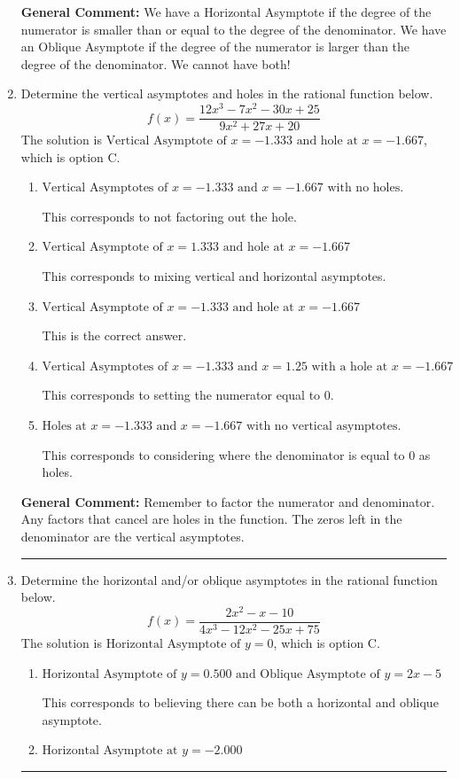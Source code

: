 \documentclass{extbook}[14pt]
\newcommand{\litem}[1]{\item #1

\rule{\textwidth}{0.4pt}}
\begin{document}
\begin{enumerate}
{\textbf{General Comment:} We have a Horizontal Asymptote if the degree of the numerator is smaller than or equal to the degree of the denominator. We have an Oblique Asymptote if the degree of the numerator is larger than the degree of the denominator. We cannot have both!
}
\litem{
Determine the vertical asymptotes and holes in the rational function below.
\[ f(x) = \frac{12x^{3} -7 x^{2} -30 x + 25}{9x^{2} +27 x + 20} \]The solution is \( \text{Vertical Asymptote of } x = -1.333 \text{ and hole at } x = -1.667 \), which is option C.\begin{enumerate}[label=\Alph*.]
\item \( \text{Vertical Asymptotes of } x = -1.333 \text{ and } x = -1.667 \text{ with no holes.} \)

This corresponds to not factoring out the hole.
\item \( \text{Vertical Asymptote of } x = 1.333 \text{ and hole at } x = -1.667 \)

This corresponds to mixing vertical and horizontal asymptotes.
\item \( \text{Vertical Asymptote of } x = -1.333 \text{ and hole at } x = -1.667 \)

This is the correct answer.
\item \( \text{Vertical Asymptotes of } x = -1.333 \text{ and } x = 1.25 \text{ with a hole at } x = -1.667 \)

This corresponds to setting the numerator equal to 0.
\item \( \text{Holes at } x = -1.333 \text{ and } x = -1.667 \text{ with no vertical asymptotes.} \)

This corresponds to considering where the denominator is equal to 0 as holes.
\end{enumerate}

\textbf{General Comment:} Remember to factor the numerator and denominator. Any factors that cancel are holes in the function. The zeros left in the denominator are the vertical asymptotes.
}
\litem{
Determine the horizontal and/or oblique asymptotes in the rational function below.
\[ f(x) = \frac{2x^{2} -x -10}{4x^{3} -12 x^{2} -25 x + 75} \]The solution is \( \text{Horizontal Asymptote of } y = 0 \), which is option C.\begin{enumerate}[label=\Alph*.]
\item \( \text{Horizontal Asymptote of } y = 0.500 \text{ and Oblique Asymptote of } y = 2x -5 \)

This corresponds to believing there can be both a horizontal and oblique asymptote.
\item \( \text{Horizontal Asymptote at } y = -2.000 \)


\end{enumerate}}
\end{enumerate}
\end{document}
